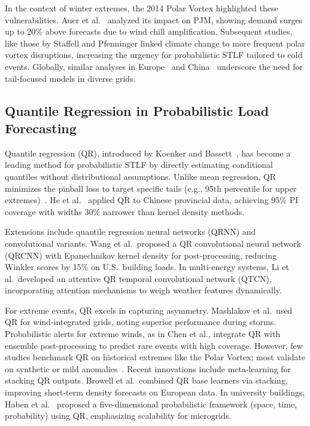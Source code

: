 \documentclass[12pt,a4paper]{article}
\begin{document}
In the context of winter extremes, the 2014 Polar Vortex highlighted these vulnerabilities. Auer et al.\ \cite{auer2014polar} analyzed its impact on PJM, showing demand surges up to 20\% above forecasts due to wind chill amplification. Subsequent studies, like those by Staffell and Pfenninger linked climate change to more frequent polar vortex disruptions, increasing the urgency for probabilistic STLF tailored to cold events. Globally, similar analyses in Europe~\cite{hippert2001neural} and China~\cite{li2015novel} underscore the need for tail-focused models in diverse grids.

\subsection{Quantile Regression in Probabilistic Load Forecasting}

Quantile regression (QR), introduced by Koenker and Bassett~\cite{koenker1978regression}, has become a leading method for probabilistic STLF by directly estimating conditional quantiles without distributional assumptions. Unlike mean regression, QR minimizes the pinball loss to target specific tails (e.g., 95th percentile for upper extremes)~\cite{maciejowska2016hybrid,nedellec2014gefcom}. He et al.\ \cite{he2017shortterm} applied QR to Chinese provincial data, achieving 95\% PI coverage with widths 30\% narrower than kernel density methods.

Extensions include quantile regression neural networks (QRNN) and convolutional variants. Wang et al.\ proposed a QR convolutional neural network (QRCNN) with Epanechnikov kernel density for post-processing, reducing Winkler scores by 15\% on U.S.\ building loads. In multi-energy systems, Li et al.\ developed an attentive QR temporal convolutional network (QTCN), incorporating attention mechanisms to weigh weather features dynamically.

For extreme events, QR excels in capturing asymmetry. Mashlakov et al.\ used QR for wind-integrated grids, noting superior performance during storms. Probabilistic alerts for extreme winds, as in Chen et al., integrate QR with ensemble post-processing to predict rare events with high coverage. However, few studies benchmark QR on historical extremes like the Polar Vortex; most validate on synthetic or mild anomalies~\cite{bessec2018shortrun,hong2014global}. Recent innovations include meta-learning for stacking QR outputs. Browell et al.\ combined QR base learners via stacking, improving short-term density forecasts on European data. In university buildings, Haben et al.\ \cite{haben2014probabilistic} proposed a five-dimensional probabilistic framework (space, time, probability) using QR, emphasizing scalability for microgrids.
\end{document}
